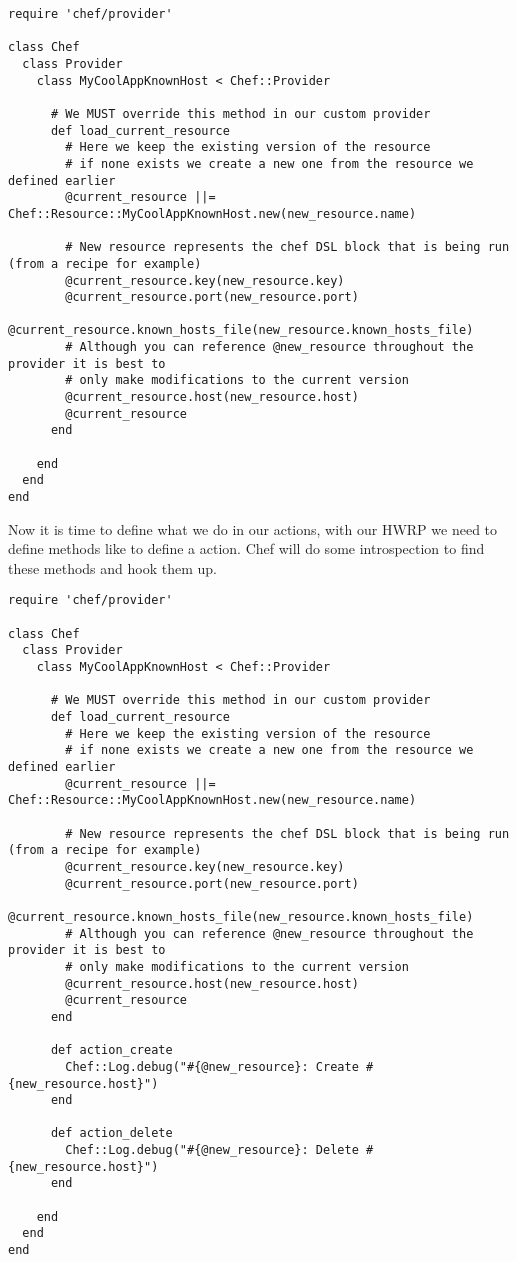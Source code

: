 \begin{lstlisting}[label=lst:cookbook-hwrp4]
require 'chef/provider'

class Chef
  class Provider
    class MyCoolAppKnownHost < Chef::Provider

      # We MUST override this method in our custom provider
      def load_current_resource
        # Here we keep the existing version of the resource
        # if none exists we create a new one from the resource we defined earlier
        @current_resource ||= Chef::Resource::MyCoolAppKnownHost.new(new_resource.name)

        # New resource represents the chef DSL block that is being run (from a recipe for example)
        @current_resource.key(new_resource.key)
        @current_resource.port(new_resource.port)
        @current_resource.known_hosts_file(new_resource.known_hosts_file)
        # Although you can reference @new_resource throughout the provider it is best to
        # only make modifications to the current version
        @current_resource.host(new_resource.host)
        @current_resource
      end

    end
  end
end
\end{lstlisting}

Now it is time to define what we do in our actions, with our HWRP we need to define methods like  to define a  action. Chef will do some introspection to find these methods and hook them up.

\begin{lstlisting}[label=lst:cookbook-hwrp5]
require 'chef/provider'

class Chef
  class Provider
    class MyCoolAppKnownHost < Chef::Provider

      # We MUST override this method in our custom provider
      def load_current_resource
        # Here we keep the existing version of the resource
        # if none exists we create a new one from the resource we defined earlier
        @current_resource ||= Chef::Resource::MyCoolAppKnownHost.new(new_resource.name)

        # New resource represents the chef DSL block that is being run (from a recipe for example)
        @current_resource.key(new_resource.key)
        @current_resource.port(new_resource.port)
        @current_resource.known_hosts_file(new_resource.known_hosts_file)
        # Although you can reference @new_resource throughout the provider it is best to
        # only make modifications to the current version
        @current_resource.host(new_resource.host)
        @current_resource
      end

      def action_create
        Chef::Log.debug("#{@new_resource}: Create #{new_resource.host}")
      end

      def action_delete
        Chef::Log.debug("#{@new_resource}: Delete #{new_resource.host}")
      end

    end
  end
end
\end{lstlisting}

